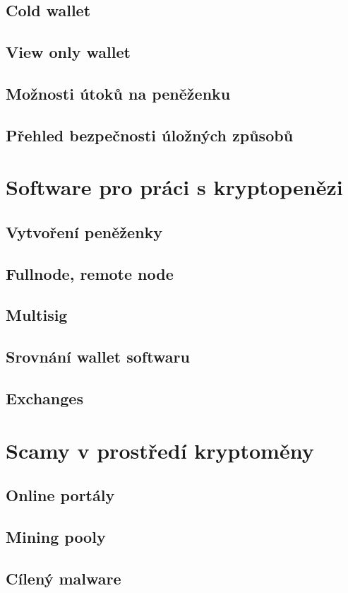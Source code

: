 \documentclass[
  printed, %
  table,   %
  nolof,     %
  nolot,     %
           oneside, color
]{fithesis3}
\begin{document}
\subsection{Cold wallet}
\subsection{View only wallet}
\subsection{Možnosti útoků na peněženku}
\subsection{Přehled bezpečnosti úložných způsobů}
\section{Software pro práci s kryptopenězi}
\subsection{Vytvoření peněženky}
\subsection{Fullnode, remote node}
\subsection{Multisig}
\subsection{Srovnání wallet softwaru}
\subsection{Exchanges}
\section{Scamy v prostředí kryptoměny}
\subsection{Online portály}
\subsection{Mining pooly}
\subsection{Cílený malware}
\end{document}
